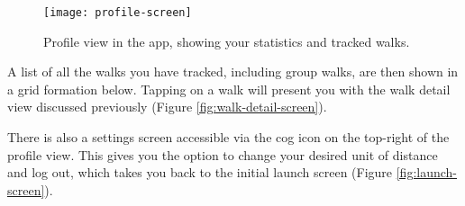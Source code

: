 \begin{figure}[hbt]
  \centering
  \texttt{[image: profile-screen]}
  \caption{Profile view in the app, showing your statistics and tracked walks.}
  \label{fig:profile-screen}
\end{figure}


A list of all the walks you have tracked, including group walks, are then shown in a grid formation below. Tapping on a walk will present you with the walk detail view discussed previously (Figure \ref{fig:walk-detail-screen}).

There is also a settings screen accessible via the cog icon on the top-right of the profile view. This gives you the option to change your desired unit of distance and log out, which takes you back to the initial launch screen (Figure \ref{fig:launch-screen}).




